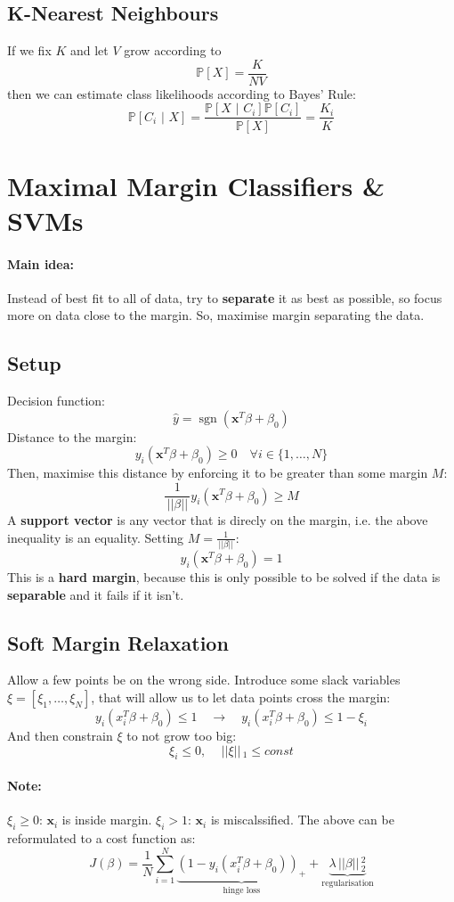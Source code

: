 \documentclass{article}
\renewcommand{\vec}[1]{\mathbf{#1}}
\renewcommand{\|}{\,\,|\,\,}
\newcommand{\norm}[1]{\,||#1||\,}
\newcommand{\Prob}{\mathbb{P}}
\DeclareMathOperator*{\sgn}{sgn}
\begin{document}
\subsection{K-Nearest Neighbours}
If we fix $K$ and let $V$ grow according to
\[
  \Prob[X] = \frac{K}{NV}
\]
then we can estimate class likelihoods according to Bayes' Rule:
\[
  \Prob[C_i \| X] = \frac{\Prob[X \| C_i]\Prob[C_i]}{\Prob[X]} = \frac{K_i}{K}
\]
\section{Maximal Margin Classifiers \& SVMs}
\paragraph{Main idea:} Instead of best fit to all of data, try to
\textbf{separate} it as best as possible, so focus more on data close to the margin.
So, maximise margin separating the data.
\subsection{Setup}
Decision function:
\[
  \hat{y} = \sgn(\vec{x}^T\beta + \beta_0)
\]
Distance to the margin:
\[
  y_i(\vec{x}^T\beta + \beta_0) \geq 0\quad \forall i \in \{1, \hdots, N\}
\]
Then, maximise this distance by enforcing it to be greater than some margin $M$:
\[
 \frac{1}{\norm{\beta}} y_i(\vec{x}^T\beta + \beta_0) \geq M
\]
A \textbf{support vector} is any vector that is direcly on the margin, i.e. the
above inequality is an equality. Setting $M = \frac{1}{\norm{\beta}}$:
\[
  y_i(\vec{x}^T\beta + \beta_0) = 1
\]
This is a \textbf{hard margin}, because this is only possible to be solved if
the data is \textbf{separable} and it fails if it isn't.
\subsection{Soft Margin Relaxation}
Allow a few points be on the wrong side. Introduce some slack variables $\xi =
[\xi_1,\hdots, \xi_N]$, that will allow us to let data points cross the margin:
\[
  y_i(x_i^T\beta + \beta_0) \leq 1 \quad \to \quad y_i(x_i^T\beta + \beta_0)
  \leq 1 - \xi_i
\]
And then constrain $\xi$ to not grow too big:
\[
  \xi_i \leq 0, \quad \norm{\xi}_1 \leq const
\]
\paragraph{Note:} $\xi_i \geq 0$: $\vec{x}_i$ is inside margin. $\xi_i > 1$:
$\vec{x}_i$ is miscalssified.
The above can be reformulated to a cost function as:
\[
  J(\beta) = \frac1N \sum_{i = 1}^N \underbrace{(1 - y_i(x_i^T\beta +
    \beta_0))_+}_{\text{hinge loss}} + \underbrace{\lambda \norm{\beta}_2^2}_{\text{regularisation}}
\]
\end{document}
